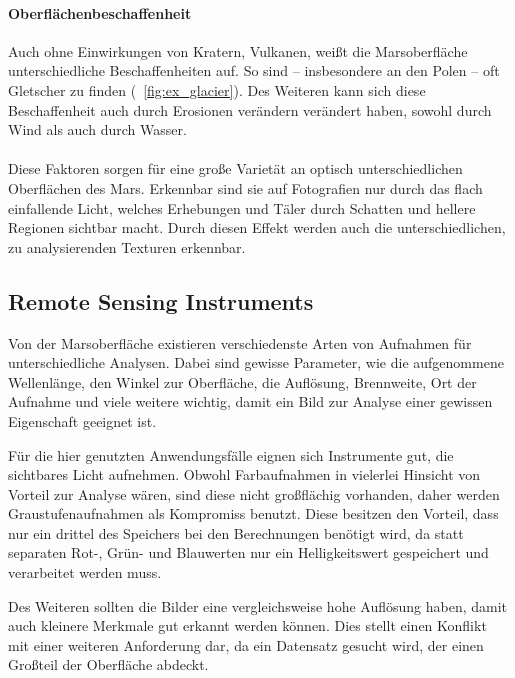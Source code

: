 \paragraph{Oberflächenbeschaffenheit}
Auch ohne Einwirkungen von Kratern, Vulkanen, \etc weißt die Marsoberfläche unterschiedliche Beschaffenheiten auf. So sind -- insbesondere an den Polen -- oft Gletscher zu finden (\vgl \figurename~\ref{fig:ex_glacier}). Des Weiteren kann sich diese Beschaffenheit auch durch Erosionen verändern \bzw verändert haben, sowohl durch Wind als auch durch Wasser.

\paragraph{}
Diese Faktoren sorgen für eine große Varietät an optisch unterschiedlichen Oberflächen des Mars. Erkennbar sind sie auf Fotografien nur durch das flach einfallende Licht, welches Erhebungen und Täler durch Schatten und hellere Regionen sichtbar macht. Durch diesen Effekt werden auch die unterschiedlichen, zu analysierenden Texturen erkennbar.

\subsection{Remote Sensing Instruments}
\label{ssec:mars_images}

Von der Marsoberfläche existieren verschiedenste Arten von Aufnahmen für unterschiedliche Analysen. Dabei sind gewisse Parameter, wie \zB die aufgenommene Wellenlänge, den Winkel zur Oberfläche, die Auflösung, Brennweite, Ort der Aufnahme und viele weitere wichtig, damit ein Bild zur Analyse einer gewissen Eigenschaft geeignet ist.

Für die hier genutzten Anwendungsfälle eignen sich Instrumente gut, die sichtbares Licht aufnehmen. Obwohl Farbaufnahmen in vielerlei Hinsicht von Vorteil zur Analyse wären, sind diese nicht großflächig vorhanden, daher werden Graustufenaufnahmen als Kompromiss benutzt. Diese besitzen den Vorteil, dass nur ein drittel des Speichers bei den Berechnungen benötigt wird, da statt separaten Rot-, Grün- und Blauwerten nur ein Helligkeitswert gespeichert und verarbeitet werden muss.

Des Weiteren sollten die Bilder eine vergleichsweise hohe Auflösung haben, damit auch kleinere Merkmale gut erkannt werden können. Dies stellt einen Konflikt mit einer weiteren Anforderung dar, da ein Datensatz gesucht wird, der einen Großteil der Oberfläche abdeckt.

